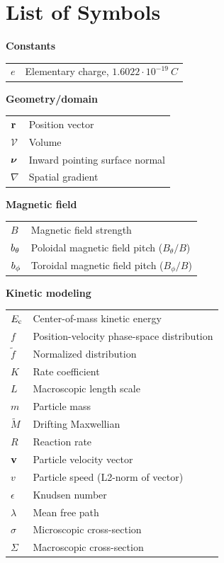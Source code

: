 \chapter*{List of Symbols}

\hspace{3mm} \textbf{Constants} \\
\begin{tabular}{L{2cm} L{8cm}}
	$e$ &  Elementary charge, $1.6022\cdot10^{-19}~C$ \\
\end{tabular}

\textbf{Geometry/domain} \\
\begin{tabular}{L{2cm} L{8cm}}
	${\bf r}$ &  Position vector \\
	$\mathcal{V}$ &  Volume \\
	${\boldsymbol \nu}_{}$ &  Inward pointing surface normal \\
	$\nabla$ &  Spatial gradient
\end{tabular}

\textbf{Magnetic field} \\
\begin{tabular}{L{2cm} L{8cm}}
	$B$ &  Magnetic field strength \\
	$b_{\theta}$ &  Poloidal magnetic field pitch ($B_{\theta}/B$) \\
	$b_{\phi}$ &  Toroidal magnetic field pitch ($B_{\phi}/B$)
\end{tabular}

\textbf{Kinetic modeling} \\
\begin{tabular}{L{2cm} L{8cm}}
	$E_{\mathrm{c}}$ &  Center-of-mass kinetic energy \\
	$f$ &   Position-velocity phase-space distribution \\
	$\widetilde{f}$ &  Normalized distribution \\
	$K$ &   Rate coefficient \\
	$L$ &   Macroscopic length scale \\
	$m$ &   Particle mass \\
	$\widetilde{M}$ &   Drifting Maxwellian \\
	$R$ &   Reaction rate \\
	${\bf v}$ &    Particle velocity vector \\	
	$v$ &    Particle speed (L2-norm of vector) \\
	$\epsilon$ &   Knudsen number \\
	$\lambda$ &   Mean free path \\
	$\sigma$ &   Microscopic cross-section \\
	$\Sigma$ &   Macroscopic cross-section \\
\end{tabular}
	
